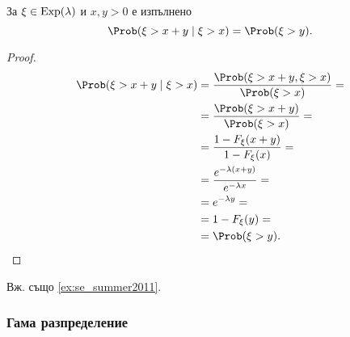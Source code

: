 \documentclass[
  headings=standardclasses,
  bibliography=totocnumbered,
]{scrartcl}
\begin{document}
\begin{theorem}\label{thm:memorylessness}
  За \( \xi \in \operatorname{Exp}(\lambda) \) и \( x, y > 0 \) е изпълнено
  \begin{equation*}
    \Prob(\xi > x + y \mid \xi > x) = \Prob(\xi > y).
  \end{equation*}
\end{theorem}
\begin{proof}
  \begin{align*}
    \Prob(\xi > x + y \mid \xi > x)
    &=
    \frac {\Prob(\xi > x + y, \xi > x)} {\Prob(\xi > x)}
    = \\ &=
    \frac {\Prob(\xi > x + y)} {\Prob(\xi > x)}
    = \\ &=
    \frac {1-F_\xi(x+y)} {1-F_\xi(x)}
    = \\ &=
    \frac {e^{-\lambda(x+y)}} {e^{-\lambda x}}
    = \\ &=
    e^{-\lambda y}
    = \\ &=
    1-F_\xi(y)
    = \\ &=
    \Prob(\xi > y).
  \end{align*}
\end{proof}

Вж. също \cref{ex:se_summer2011}.

\subsubsection{Гама разпределение}\label{sec:gamma}
\end{document}
